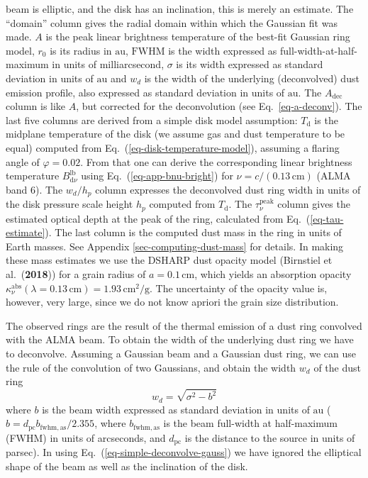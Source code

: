 \documentclass{aa}
\def\paperdsharpbirnstiel{Birnstiel et al.\ ({\bf 2018})}
\begin{document}
\begin{table*}
{  beam is elliptic, and the disk has an inclination, this is merely an estimate.
  The ``domain'' column gives the radial domain within which the Gaussian fit
  was made. $A$ is the peak linear brightness temperature of the best-fit
  Gaussian ring model, $r_0$ is its radius in $\mathrm{au}$, $\mathrm{FWHM}$ is
  the width expressed as full-width-at-half-maximum in units of milliarcsecond,
  $\sigma$ is its width expressed as standard deviation in units of
  $\mathrm{au}$ and $w_d$ is the width of the underlying (deconvolved) dust
  emission profile, also expressed as standard deviation in units of
  $\mathrm{au}$. The $A_{\mathrm{dec}}$ column is like $A$, but corrected for
  the deconvolution (see Eq.~\ref{eq-a-deconv}). The last five columns are
  derived from a simple disk model assumption: $T_{\mathrm{d}}$ is the midplane
  temperature of the disk (we assume gas and dust temperature to be equal)
  computed from Eq.~(\ref{eq-disk-temperature-model}), assuming a flaring angle
  of $\varphi=0.02$. From that one can derive the corresponding linear
  brightness temperature $B_{\mathrm{d}\nu}^{\mathrm{lb}}$ using
  Eq.~(\ref{eq-app-bnu-bright}) for $\nu=c/(0.13\,\mathrm{cm})$ (ALMA band 6).
  The $w_d/h_p$ column expresses the deconvolved dust ring width in units of the
  disk pressure scale height $h_p$ computed from $T_{\mathrm{d}}$. The
  $\tau_\nu^{\mathrm{peak}}$ column gives the estimated optical depth at the peak of the ring,
  calculated from Eq.~(\ref{eq-tau-estimate}). The last column is the computed dust mass in the
  ring in units of Earth masses. See Appendix \ref{sec-computing-dust-mass} for
  details. In making these mass estimates we use the DSHARP dust opacity model
  (\paperdsharpbirnstiel{}) for a grain radius of $a=0.1\,\mathrm{cm}$, which
  yields an absorption opacity
  $\kappa_\nu^{\mathrm{abs}}(\lambda=0.13\,\mathrm{cm})=1.93\,\mathrm{cm}^2/\mathrm{g}$.
  The uncertainty of the opacity value is, however, very large, since we do not
  know apriori the grain size distribution.}
\end{table*}

The observed rings are the result of the thermal emission of a dust ring convolved
with the ALMA beam. To obtain the width of the
underlying dust ring we have to deconvolve. Assuming a Gaussian beam and a
Gaussian dust ring, we can use the rule of the convolution of two Gaussians, and
obtain the width $w_d$ of the dust ring
\begin{equation}\label{eq-simple-deconvolve-gauss}
w_d=\sqrt{\sigma^2-b^2}
\end{equation}
where $b$ is the beam width expressed as standard deviation in units of
$\mathrm{au}$ ($b=d_{\mathrm{pc}}b_{\mathrm{fwhm,as}}/2.355$, where
$b_{\mathrm{fwhm,as}}$ is the beam full-width at half-maximum (FWHM) in units of
arcseconds, and $d_{\mathrm{pc}}$ is the distance to the source in units of
parsec). In using Eq.~(\ref{eq-simple-deconvolve-gauss}) we have ignored the
elliptical shape of the beam as well as the inclination of the disk.
\end{document}
